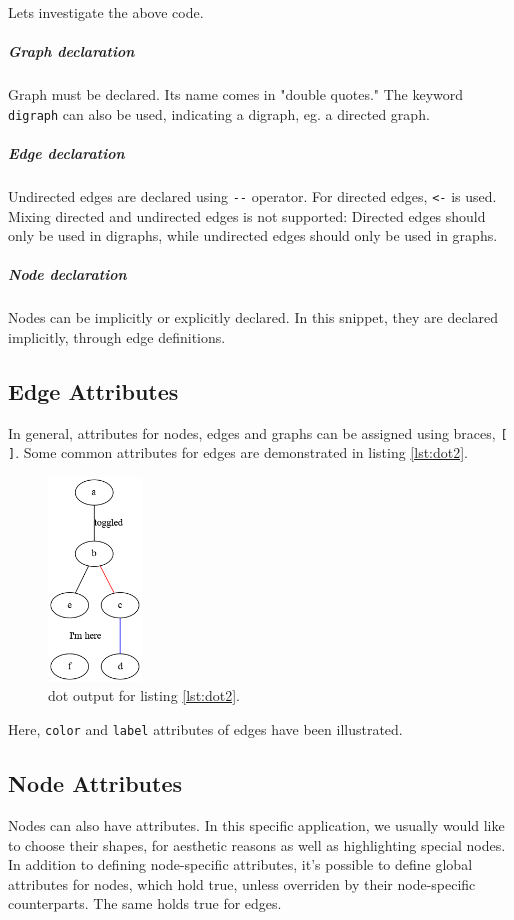 \documentclass{article}
\begin{document}
	Lets investigate the above code.
	
	\subparagraph{Graph declaration}
		Graph must be declared. Its name comes in "double quotes." The keyword \lstinline{digraph} can also be used, indicating a digraph, eg. a directed graph.
	
	\subparagraph{Edge declaration}
		Undirected edges are declared using \lstinline{--} operator. For directed edges, \lstinline{<-} is used. Mixing directed and undirected edges is not supported: Directed edges should only be used in digraphs, while undirected edges should only be used in graphs.

	\subparagraph{Node declaration}
		Nodes can be implicitly or explicitly declared. In this snippet, they are declared implicitly, through edge definitions.
	
	\subsection{Edge Attributes}
	In general, attributes for nodes, edges and graphs can be assigned using braces, \lstinline{[ ]}. Some common attributes for edges are demonstrated in listing \ref{lst:dot2}.

	

	\begin{figure}[H]
		\begin{center}
			\includegraphics[width=25mm]{figure2.png}
		\end{center}
		\caption{dot output for listing \ref{lst:dot2}.}
		\label{fig:png2}
	\end{figure}

	Here, \lstinline{color} and \lstinline{label} attributes of edges have been illustrated. 

	\subsection{Node Attributes}
	Nodes can also have attributes. In this specific application, we usually would like to choose their shapes, for aesthetic reasons as well as highlighting special nodes. In addition to defining node-specific attributes, it's possible to define global attributes for nodes, which hold true, unless overriden by their node-specific counterparts. The same holds true for edges.
\end{document}
